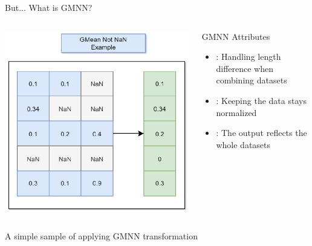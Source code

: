 \documentclass[compress, mathserif, fleqn, 10pt]{beamer}
\begin{document}
	\begin{frame}{But... What is GMNN?}
		\begin{columns}
			\begin{column}{0.5\textwidth}
				\includegraphics[width=\textwidth]{images/gmnn.eps}
			\end{column}
			\begin{column}{0.5\textwidth}
				\begin{block}{GMNN Attributes}
					\begin{itemize}
						\item {}: Handling length difference when combining datasets
						\smallskip
						
						\item {}: Keeping the data stays normalized
						\smallskip
						
						\item {}: The output reflects the whole datasets
						\smallskip
					\end{itemize}
				\end{block}
				\vspace*{1cm}
			\end{column}
		\end{columns}
		\bigskip
		\centerline{A simple sample of applying GMNN transformation}
	\end{frame}
	
\end{document}
